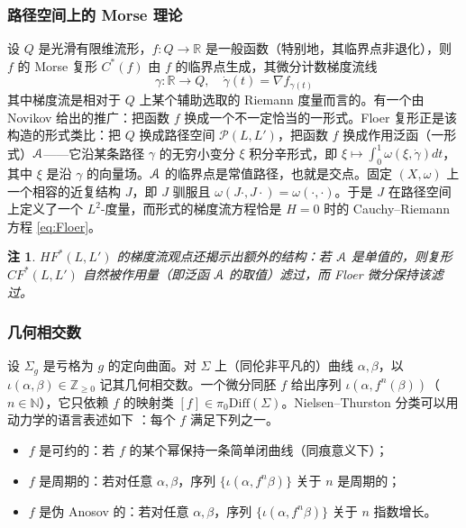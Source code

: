 \documentclass[11pt,a4paper]{article}
\numberwithin{equation}{section}
\newtheorem{Remark}[thm]{注}
\newcommand{\bR}{\mathbb{R}}
\newcommand{\bZ}{\mathbb{Z}}
\newcommand{\bN}{\mathbb{N}}
\newcommand{\scrA}{\EuScript{A}}
\newcommand{\Diff}{\mathrm{Diff}}
\begin{document}
\subsubsection{路径空间上的 Morse 理论} 设 $Q$ 是光滑有限维流形，$f: Q \rightarrow \bR$ 是一般函数（特别地，其临界点非退化），则 $f$ 的 Morse 复形 $C^*(f)$ 由 $f$ 的临界点生成，其微分计数梯度流线
\[
\gamma: \bR \rightarrow Q,  \quad \dot{\gamma}(t) = \nabla f_{\gamma(t)}
\]
其中梯度流是相对于 $Q$ 上某个辅助选取的 Riemann 度量而言的。有一个由 Novikov 给出的推广：把函数 $f$ 换成一个不一定恰当的一形式。Floer 复形正是该构造的形式类比：把 $Q$ 换成路径空间 $\mathcal{P}(L,L')$，把函数 $f$ 换成作用泛函（一形式）$\scrA$——它沿某条路径 $\gamma$ 的无穷小变分 $\xi$ 积分辛形式，即 $\xi \mapsto \int_0^1\omega(\xi, \dot{\gamma}) dt$，其中 $\xi$ 是沿 $\gamma$ 的向量场。$\scrA$ 的临界点是常值路径，也就是交点。固定 $(X,\omega)$ 上一个相容的近复结构 $J$，即 $J$ 驯服且 $\omega(J\cdot, J\cdot) = \omega(\cdot,\cdot)$。于是 $J$ 在路径空间上定义了一个 $L^2$-度量，而形式的梯度流方程恰是 $H=0$ 时的 Cauchy–Riemann 方程 \eqref{eq:Floer}。

\begin{Remark} \label{Rem:Filtration}
$HF^*(L,L')$ 的梯度流观点还揭示出额外的结构：若 $\scrA$ 是单值的，则复形 $CF^*(L,L')$ 自然被作用量（即泛函 $\scrA$ 的取值）滤过，而 Floer 微分保持该滤过。
\end{Remark}

\subsubsection{几何相交数} 设 $\Sigma_g$ 是亏格为 $g$ 的定向曲面。对 $\Sigma$ 上（同伦非平凡的）曲线 $\alpha, \beta$，以 $\iota(\alpha,\beta) \in \bZ_{\geq 0}$ 记其几何相交数。一个微分同胚 $f$ 给出序列 $\iota(\alpha, f^n(\beta))$（$n\in \bN$），它只依赖 $f$ 的映射类 $[f] \in \pi_0\Diff(\Sigma)$。Nielsen–Thurston 分类可以用动力学的语言表述如下 \cite{FLP}：每个 $f$ 满足下列之一。

\begin{itemize}
\item $f$ 是可约的：若 $f$ 的某个幂保持一条简单闭曲线（同痕意义下）；
\item $f$ 是周期的：若对任意 $\alpha, \beta$，序列 $\{\iota(\alpha, f^n\beta)\}$ 关于 $n$ 是周期的；
\item $f$ 是伪 Anosov 的：若对任意 $\alpha,\beta$，序列 $\{\iota(\alpha, f^n\beta)\}$ 关于 $n$ 指数增长。
\end{itemize}
\end{document}
